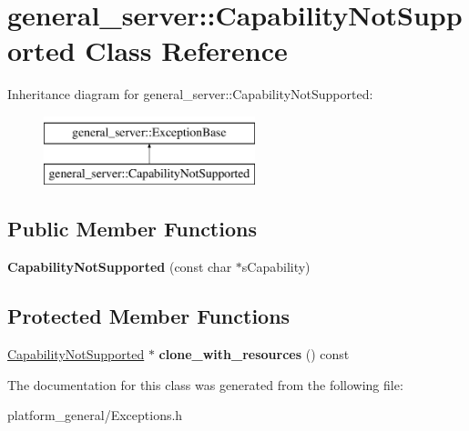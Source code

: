 \hypertarget{classgeneral__server_1_1CapabilityNotSupported}{\section{general\-\_\-server\-:\-:\-Capability\-Not\-Supported \-Class \-Reference}
\label{classgeneral__server_1_1CapabilityNotSupported}
}
\-Inheritance diagram for general\-\_\-server\-:\-:\-Capability\-Not\-Supported\-:\begin{figure}[H]
\begin{center}
\leavevmode
\includegraphics[height=2.000000cm]{classgeneral__server_1_1CapabilityNotSupported}
\end{center}
\end{figure}
\subsection*{\-Public \-Member \-Functions}
\begin{DoxyCompactItemize}
\item 
\hypertarget{classgeneral__server_1_1CapabilityNotSupported_a85f5735cd718702e5768b3e4421b7872}{{\bfseries \-Capability\-Not\-Supported} (const char $\ast$s\-Capability)}\label{classgeneral__server_1_1CapabilityNotSupported_a85f5735cd718702e5768b3e4421b7872}

\end{DoxyCompactItemize}
\subsection*{\-Protected \-Member \-Functions}
\begin{DoxyCompactItemize}
\item 
\hypertarget{classgeneral__server_1_1CapabilityNotSupported_a130a98b8e513666ad5aa8167d44b9730}{\hyperlink{classgeneral__server_1_1CapabilityNotSupported}{\-Capability\-Not\-Supported} $\ast$ {\bfseries clone\-\_\-with\-\_\-resources} () const }\label{classgeneral__server_1_1CapabilityNotSupported_a130a98b8e513666ad5aa8167d44b9730}

\end{DoxyCompactItemize}


\-The documentation for this class was generated from the following file\-:\begin{DoxyCompactItemize}
\item 
platform\-\_\-general/\-Exceptions.\-h\end{DoxyCompactItemize}
